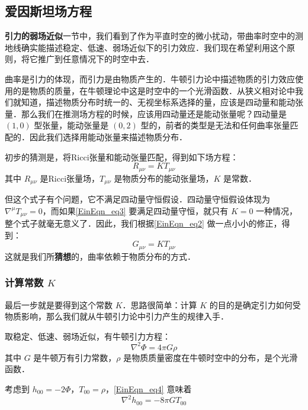 \subsection{爱因斯坦场方程}

\textbf{引力的弱场近似}一节中，我们看到了作为平直时空的微小扰动，带曲率时空中的测地线确实能描述稳定、低速、弱场近似下的引力效应．我们现在希望利用这个原则，将它推广到任意情况下的时空中去．

曲率是引力的体现，而引力是由物质产生的．牛顿引力论中描述物质的引力效应使用的是物质的质量，在牛顿理论中这是时空中的一个光滑函数．从狭义相对论中我们就知道，描述物质分布时统一的、无视坐标系选择的量，应该是四动量和能动张量．那么我们在推测场方程的时候，应该用四动量还是能动张量呢？四动量是 $(1, 0)$ 型张量，能动张量是 $(0, 2)$ 型的，前者的类型是无法和任何曲率张量匹配的．因此我们选择用能动张量来描述物质分布．

初步的猜测是，将Ricci张量和能动张量匹配，得到如下场方程：
\begin{equation}\label{EinEqn_eq3}
R_{\mu\nu}=KT_{\mu\nu}
\end{equation}
其中 $R_{\mu\nu}$ 是Ricci张量场，$T_{\mu\nu}$ 是物质分布的能动张量场，$K$ 是常数．

但这个式子有个问题，它不满足四动量守恒假设．四动量守恒假设体现为 $\nabla^\mu T_{\mu\nu}=0$，而如果\autoref{EinEqn_eq3} 要满足四动量守恒，就只有 $K=0$ 一种情况，整个式子就毫无意义了．因此，我们根据\autoref{EinEqn_eq2} 做一点小小的修正，得到：
\begin{equation}
G_{\mu\nu}=KT_{\mu\nu}
\end{equation}
这就是我们所\textbf{猜想}的，曲率依赖于物质分布的方式．



\subsubsection{计算常数 $K$}


最后一步就是要得到这个常数 $K$．思路很简单：计算 $K$ 的目的是确定引力如何受物质影响，那么我们就从牛顿引力论中引力产生的规律入手．

取稳定、低速、弱场近似，有牛顿引力方程：
\begin{equation}\label{EinEqn_eq4}
\nabla^2\Phi=4\pi G\rho
\end{equation}
其中 $G$ 是牛顿万有引力常数，$\rho$ 是物质质量密度在牛顿时空中的分布，是个光滑函数．

考虑到 $h_{00}=-2\Phi$，$T_{00}=\rho$，\autoref{EinEqn_eq4} 意味着
\begin{equation}\label{EinEqn_eq7}
\nabla^2h_{00}=-8\pi G T_{00}
\end{equation}



